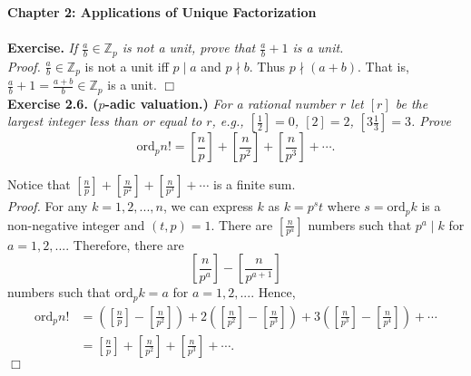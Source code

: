\documentclass{article}
\begin{document}
\textbf{\Large Chapter 2: Applications of Unique Factorization} \\\\



\textbf{Exercise.}
\emph{If $\frac{a}{b} \in \mathbb{Z}_{p}$ is not a unit, prove that
$\frac{a}{b} + 1$ is a unit.} \\

\emph{Proof.}
$\frac{a}{b} \in \mathbb{Z}_{p}$ is not a unit iff $p \mid a$ and $p \nmid b$.
Thus $p \nmid (a +b)$. That is, $\frac{a}{b} + 1 = \frac{a + b}{b} \in \mathbb{Z}_{p}$ is a unit.
$\Box$ \\



\textbf{Exercise 2.6. ($p$-adic valuation.)}
\emph{For a rational number $r$ let $[r]$ be the largest integer less than or equal to $r$,
e.g., $[\frac{1}{2}] = 0$, $[2] = 2$, $[3 \frac{1}{3}] = 3$. Prove
$$\text{ord}_p n!
= \left[\frac{n}{p}\right] + \left[\frac{n}{p^2}\right] + \left[\frac{n}{p^3}\right] + \cdots.$$
}

Notice that $[\frac{n}{p}] + [\frac{n}{p^2}] + [\frac{n}{p^3}] + \cdots$ is a finite sum. \\

\emph{Proof.}
For any $k = 1, 2, ..., n$, we can express $k$ as $k = p^s t$
where $s = \text{ord}_p k$ is a non-negative integer and $(t, p) = 1$.
There are $[\frac{n}{p^a}]$ numbers such that $p^a \mid k$ for $a = 1, 2, ...$.
Therefore, there are $$\left[\frac{n}{p^a}\right] - \left[\frac{n}{p^{a+1}}\right]$$
numbers such that $\text{ord}_p k = a$ for $a = 1, 2, ...$. Hence,
\begin{align*}
\text{ord}_p n!
&= \left( \left[\frac{n}{p}\right] - \left[\frac{n}{p^2}\right] \right)
 + 2 \left( \left[\frac{n}{p^2}\right] - \left[\frac{n}{p^3}\right] \right)
 + 3 \left( \left[\frac{n}{p^3}\right] - \left[\frac{n}{p^4}\right] \right) + \cdots \\
&= \left[\frac{n}{p}\right] + \left[\frac{n}{p^2}\right] + \left[\frac{n}{p^3}\right] + \cdots.
\end{align*}
$\Box$ \\
\end{document}
